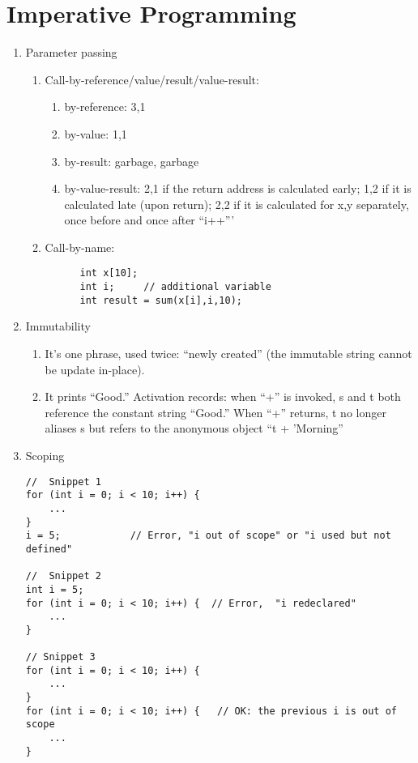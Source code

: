 \documentclass{article}
\begin{document}
\section*{Imperative Programming}
\begin{enumerate}

\item Parameter passing
\begin{enumerate}
  \item Call-by-reference/value/result/value-result:
  \begin{enumerate}
    \item by-reference: 3,1
     \item by-value: 1,1
     \item by-result: garbage, garbage
     \item by-value-result: 2,1 if the return address is calculated early;
          1,2 if it is calculated late (upon return); 
          2,2 if it is calculated for x,y separately, once before and once
          after ``i++'''
   \end{enumerate}
  \item Call-by-name:
     \begin{verbatim}
      int x[10];
      int i;     // additional variable
      int result = sum(x[i],i,10);
      \end{verbatim}
\end{enumerate}
\item Immutability
\begin{enumerate}
  \item It's one phrase, used twice: ``newly created'' (the immutable
        string cannot be update in-place). 
   \item It prints ``Good.''
         Activation records: when ``+'' is invoked, s and t both reference 
         the constant string ``Good.'' When ``+'' returns, t no longer
         aliases s but refers to the anonymous object ``t + 'Morning''          
   \end{enumerate}


\item Scoping
{\small
\begin{verbatim}
//  Snippet 1
for (int i = 0; i < 10; i++) {
    ...
}
i = 5;            // Error, "i out of scope" or "i used but not defined" 

//  Snippet 2 
int i = 5;
for (int i = 0; i < 10; i++) {  // Error,  "i redeclared"
    ...
}
    
// Snippet 3
for (int i = 0; i < 10; i++) {
    ...
}
for (int i = 0; i < 10; i++) {   // OK: the previous i is out of scope
    ...
}
\end{verbatim}
}
\end{enumerate}
\end{document}
